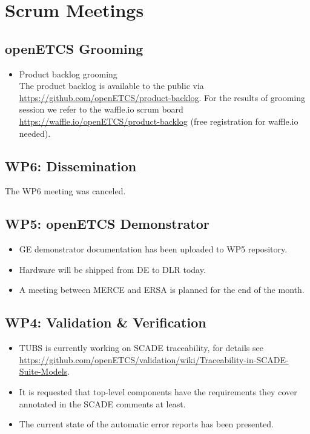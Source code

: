 \documentclass[a4paper, 11pt]{article}
\begin{document}

\section{Scrum Meetings}

\subsection{openETCS Grooming}
\begin{itemize}
\item Product backlog grooming\\
The product backlog is available to the public via 
\url{https://github.com/openETCS/product-backlog}. For the results of grooming session we refer to the waffle.io scrum board \url{https://waffle.io/openETCS/product-backlog} (free registration for waffle.io needed).

\end{itemize}

\subsection{WP6: Dissemination}

The WP6 meeting was canceled.
 
\subsection{WP5: openETCS Demonstrator}

\begin{itemize}
\item GE demonstrator documentation has been uploaded to WP5 repository.
\item Hardware will be shipped from DE to DLR today.
\item A meeting between MERCE and ERSA is planned for the end of the month.
\end{itemize}

\subsection{WP4: Validation \& Verification}
\begin{itemize}
\item TUBS is currently working on SCADE traceability, for details see \url{https://github.com/openETCS/validation/wiki/Traceability-in-SCADE-Suite-Models}.\
\item It is requested that top-level components have the requirements they cover annotated in the SCADE comments at least.
\item The current state of the automatic error reports has been presented.
\end{itemize}
\end{document}

